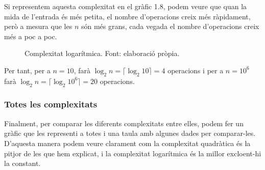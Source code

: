 Si representem aquesta complexitat en el gràfic 1.8, podem veure que quan la mida de l'entrada és més petita, el nombre d'operacions creix més ràpidament, però a mesura que les $n$ són més grans, cada vegada el nombre d'operacions creix més a poc a poc.
\begin{figure}[h]
    \centering
    \caption[Complexitat logarítmica.]{Complexitat logarítmica. Font: elaboració pròpia.}
    \label{fig:my_label}
\end{figure}



Per tant, per a $n = 10$, farà $\log_2{n} = \lceil\log_2{10}\rceil = 4$ operacions i per a $n = 10^6$ farà $\log_2{n} = \lceil\log_2{10^6}\rceil = 20$ operacions.

\subsubsection*{Totes les complexitats}
Finalment, per comparar les diferents complexitats entre elles, podem fer un gràfic que les representi a totes i una taula amb algunes dades per comparar-les. D'aquesta manera podem veure clarament com la complexitat quadràtica és la pitjor de les que hem explicat, i la complexitat logarítmica és la millor excloent-hi la constant.

